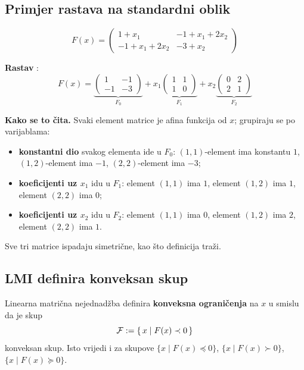 \subsection{Primjer rastava na standardni oblik}

\[
F(x) = \begin{pmatrix}
1 + x_1 & -1 + x_1 + 2x_2 \\
-1 + x_1 + 2x_2 & -3 + x_2
\end{pmatrix}
\]

\textbf{Rastav} :
\[
F(x) = \underbrace{\begin{pmatrix}1 & -1 \\ -1 & -3\end{pmatrix}}_{F_0}
     + x_1\underbrace{\begin{pmatrix}1 & 1 \\ 1 & 0\end{pmatrix}}_{F_1}
     + x_2\underbrace{\begin{pmatrix}0 & 2 \\ 2 & 1\end{pmatrix}}_{F_2}
\]

\textbf{Kako se to čita.} Svaki element matrice je afina funkcija od $x$;
grupiraju se po varijablama:
\begin{itemize}
  \item \textbf{konstantni dio} svakog elementa ide u $F_0$: $(1,1)$-element
        ima konstantu $1$, $(1,2)$-element ima $-1$, $(2,2)$-element ima $-3$;
  \item \textbf{koeficijenti uz $x_1$} idu u $F_1$: element $(1,1)$ ima $1$,
        element $(1,2)$ ima $1$, element $(2,2)$ ima $0$;
  \item \textbf{koeficijenti uz $x_2$} idu u $F_2$: element $(1,1)$ ima $0$,
        element $(1,2)$ ima $2$, element $(2,2)$ ima $1$.
\end{itemize}
Sve tri matrice ispadaju simetrične, kao što definicija traži. \checkmark

\subsection{LMI definira konveksan skup}

\begin{teorem}
Linearna matrična nejednadžba definira \textbf{konveksna ograničenja} na $x$ u
smislu da je skup
\[
\mathcal{F} := \{\, x \mid F(x) \prec 0 \,\}
\]
konveksan skup. Isto vrijedi i za skupove $\{x \mid F(x) \preceq 0\}$,
$\{x \mid F(x) \succ 0\}$, $\{x \mid F(x) \succeq 0\}$.
\end{teorem}

